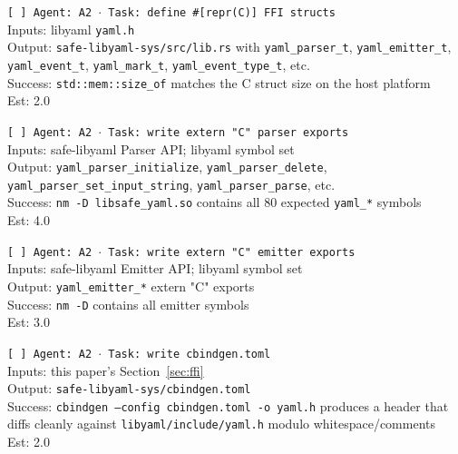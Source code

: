 \documentclass[12pt]{article}
\theoremstyle{definition}
\theoremstyle{remark}
\begin{document}
\begin{small}
\noindent\texttt{[ ] Agent: A2 $\cdot$ Task: define \#[repr(C)] FFI structs}\\
\hspace*{2em}Inputs: libyaml \texttt{yaml.h}\\
\hspace*{2em}Output: \texttt{safe-libyaml-sys/src/lib.rs} with \texttt{yaml\_parser\_t}, \texttt{yaml\_emitter\_t}, \texttt{yaml\_event\_t}, \texttt{yaml\_mark\_t}, \texttt{yaml\_event\_type\_t}, etc.\\
\hspace*{2em}Success: \texttt{std::mem::size\_of} matches the C struct size on the host platform\\
\hspace*{2em}Est: 2.0

\noindent\texttt{[ ] Agent: A2 $\cdot$ Task: write extern "C" parser exports}\\
\hspace*{2em}Inputs: safe-libyaml Parser API; libyaml symbol set\\
\hspace*{2em}Output: \texttt{yaml\_parser\_initialize}, \texttt{yaml\_parser\_delete}, \texttt{yaml\_parser\_set\_input\_string}, \texttt{yaml\_parser\_parse}, etc.\\
\hspace*{2em}Success: \texttt{nm -D libsafe\_yaml.so} contains all 80 expected \texttt{yaml\_*} symbols\\
\hspace*{2em}Est: 4.0

\noindent\texttt{[ ] Agent: A2 $\cdot$ Task: write extern "C" emitter exports}\\
\hspace*{2em}Inputs: safe-libyaml Emitter API; libyaml symbol set\\
\hspace*{2em}Output: \texttt{yaml\_emitter\_*} extern "C" exports\\
\hspace*{2em}Success: \texttt{nm -D} contains all emitter symbols\\
\hspace*{2em}Est: 3.0

\noindent\texttt{[ ] Agent: A2 $\cdot$ Task: write cbindgen.toml}\\
\hspace*{2em}Inputs: this paper's Section~\ref{sec:ffi}\\
\hspace*{2em}Output: \texttt{safe-libyaml-sys/cbindgen.toml}\\
\hspace*{2em}Success: \texttt{cbindgen --config cbindgen.toml -o yaml.h} produces a header that diffs cleanly against \texttt{libyaml/include/yaml.h} modulo whitespace/comments\\
\hspace*{2em}Est: 2.0


\end{small}
\end{document}
